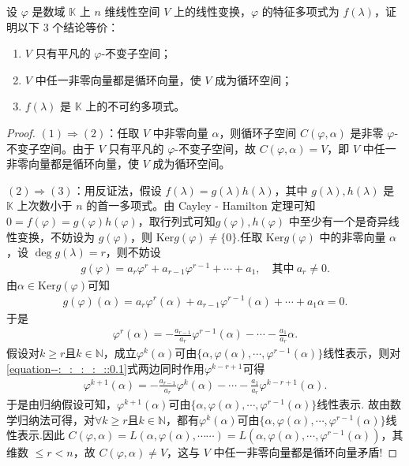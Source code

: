 \documentclass[../../main.tex]{subfiles}%
\begin{document}
\begin{proposition}\label{proposition:特征多项式是不可约多项式的刻画}
设 $\varphi$ 是数域 $\mathbb{K}$ 上 $n$ 维线性空间 $V$ 上的线性变换，$\varphi$ 的特征多项式为 $f(\lambda)$，证明以下 3 个结论等价：
\begin{enumerate}[(1)]
\item $V$ 只有平凡的 $\varphi$-不变子空间；

\item $V$ 中任一非零向量都是循环向量，使 $V$ 成为循环空间；

\item $f(\lambda)$ 是 $\mathbb{K}$ 上的不可约多项式。
\end{enumerate}
\end{proposition}
\begin{proof}
$(1)\Rightarrow(2)$：任取 $V$ 中非零向量 $\alpha$，则循环子空间 $C(\varphi,\alpha)$ 是非零 $\varphi$-不变子空间。由于 $V$ 只有平凡的 $\varphi$-不变子空间，故 $C(\varphi,\alpha)=V$，即 $V$ 中任一非零向量都是循环向量，使 $V$ 成为循环空间。

$(2)\Rightarrow(3)$：用反证法，假设 $f(\lambda)=g(\lambda)h(\lambda)$，其中 $g(\lambda),h(\lambda)$ 是 $\mathbb{K}$ 上次数小于 $n$ 的首一多项式。由 Cayley - Hamilton 定理可知 $0=f(\varphi)=g(\varphi)h(\varphi)$，取行列式可知$g(\varphi),h(\varphi)$ 中至少有一个是奇异线性变换，不妨设为 $g(\varphi)$，则 $\mathrm{Ker}g(\varphi)\neq \{0\}$.任取 $\mathrm{Ker}g(\varphi)$ 中的非零向量 $\alpha$，设 $\deg g(\lambda)=r$，则不妨设
\begin{align*}
g(\varphi) = a_r \varphi^r + a_{r-1} \varphi^{r-1} + \cdots + a_1, \quad \text{其中} \ a_r \neq 0.
\end{align*}
由$\alpha \in \mathrm{Ker} g(\varphi)$可知
\begin{align*}
g(\varphi)(\alpha) = a_r \varphi^r(\alpha) + a_{r-1} \varphi^{r-1}(\alpha) + \cdots + a_1 \alpha = 0.
\end{align*}
于是
\begin{align}
\varphi^r(\alpha) = -\frac{a_{r-1}}{a_r} \varphi^{r-1}(\alpha) - \cdots - \frac{a_1}{a_r} \alpha. \label{equation--:_:_:_:_::0.1}
\end{align}
假设对$k \geqslant  r$且$k \in \mathbb{N}$，成立$\varphi^k(\alpha)$可由$\{ \alpha, \varphi(\alpha), \cdots, \varphi^{r-1}(\alpha) \}$线性表示，则对\eqref{equation--:_:_:_:_::0.1}式两边同时作用$\varphi^{k-r+1}$可得
\begin{align*}
\varphi^{k+1}(\alpha) = -\frac{a_{r-1}}{a_r} \varphi^k(\alpha) - \cdots - \frac{a_1}{a_r} \varphi^{k-r+1}(\alpha).
\end{align*}
于是由归纳假设可知，$\varphi^{k+1}(\alpha)$可由$\{ \alpha, \varphi(\alpha), \cdots, \varphi^{r-1}(\alpha) \}$线性表示. 故由数学归纳法可得，对$\forall k \geqslant  r$且$k \in \mathbb{N}$，都有$\varphi^k(\alpha)$可由$\{ \alpha, \varphi(\alpha), \cdots, \varphi^{r-1}(\alpha) \}$线性表示.因此
$C(\varphi ,\alpha )=L(\alpha ,\varphi (\alpha ),\cdots \cdots )=L(\alpha ,\varphi (\alpha ),\cdots ,\varphi ^{r-1}(\alpha ))$，其维数 $\leqslant  r < n$，故 $C(\varphi,\alpha)\neq V$，这与 $V$ 中任一非零向量都是循环向量矛盾!


\end{proof}
\end{document}
